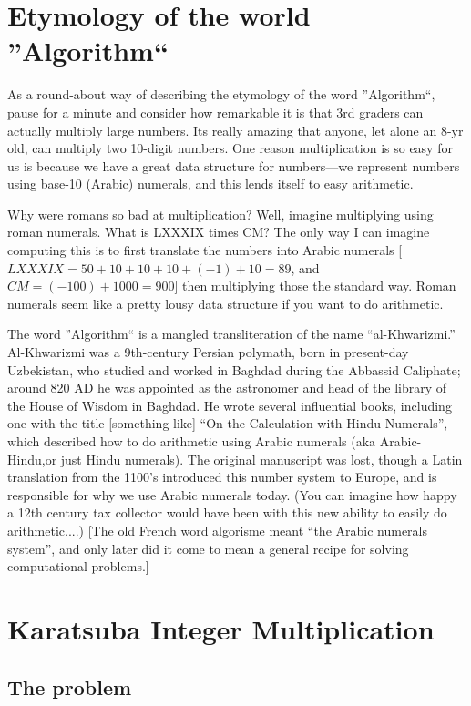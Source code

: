 \documentclass [12pt]{article}
\begin{document}
\begin{enumerate}
    
\section{Etymology of the world ''Algorithm``}

As a round-about way of describing the etymology of the word ''Algorithm``, pause for a minute and consider how remarkable it is that 3rd graders can actually multiply large numbers. Its really amazing that anyone, let alone an 8-yr old, can multiply two 10-digit numbers. One reason multiplication is so easy for us is because we have a great data structure for numbers—we represent numbers using base-10 (Arabic) numerals, and this lends itself to easy arithmetic.

Why were romans so bad at multiplication? Well, imagine multiplying using roman numerals. What is LXXXIX times CM? The only way I can imagine computing this is to first translate the numbers into Arabic numerals [$LXXXIX = 50 + 10 + 10 + 10 + (-1) + 10 = 89$, and
$CM = (-100) + 1000 = 900$] then multiplying those the standard way. Roman numerals
seem like a pretty lousy data structure if you want to do arithmetic.

The word ''Algorithm`` is a mangled transliteration of the name “al-Khwarizmi.” Al-Khwarizmi was a 9th-century Persian polymath, born in present-day Uzbekistan, who studied and worked in Baghdad during the Abbassid Caliphate; around 820 AD he was appointed as the astronomer and head of the library of the House of Wisdom in Baghdad. He wrote several influential books, including one with the title [something like] “On the Calculation with Hindu Numerals”, which described how to do arithmetic using Arabic numerals (aka Arabic-Hindu,or just Hindu numerals). The original manuscript was lost, though a Latin translation from the 1100’s introduced this number system to Europe, and is responsible for why we use Arabic numerals today. (You can imagine how happy a 12th century tax collector would have been with this new ability to easily do arithmetic....) [The old French word algorisme meant “the Arabic numerals system”, and only later did it come to mean a general recipe for solving computational problems.]

\section{Karatsuba Integer Multiplication}

\subsection{The problem}


\end{enumerate}
\end{document}
